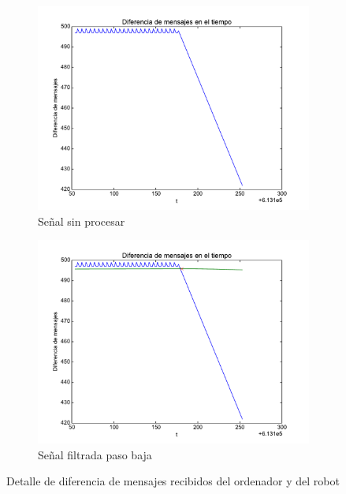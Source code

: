 \begin{figure}[]
	\centering
	\begin{subfigure}[b]{0.45\textwidth}
		\includegraphics[width=\linewidth]{imagenes/desarrollo/diferenciadetalle.pdf}
		\caption{Señal sin procesar}
		\label{fig:desarrollo/diferenciadetalle}
	\end{subfigure}
	\begin{subfigure}[b]{0.45\textwidth}
		\includegraphics[width=\linewidth]{imagenes/desarrollo/diferenciafiltdetalle.pdf}
		\caption{Señal filtrada paso baja}
		\label{fig:desarrollo/diferenciadetallefilt}
	\end{subfigure}
	\caption{Detalle de diferencia de mensajes recibidos del ordenador y del robot}
\end{figure}

